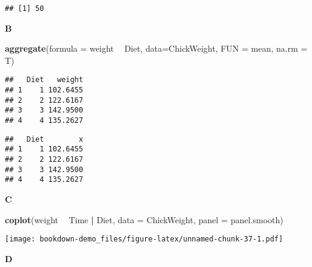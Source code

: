 \documentclass[]{book}
\newenvironment{Shaded}{\begin{snugshade}}{\end{snugshade}}
\newcommand{\CommentTok}[1]{\textcolor[rgb]{0.56,0.35,0.01}{\textit{#1}}}
\newcommand{\DataTypeTok}[1]{\textcolor[rgb]{0.13,0.29,0.53}{#1}}
\newcommand{\KeywordTok}[1]{\textcolor[rgb]{0.13,0.29,0.53}{\textbf{#1}}}
\newcommand{\NormalTok}[1]{#1}
\newcommand{\OperatorTok}[1]{\textcolor[rgb]{0.81,0.36,0.00}{\textbf{#1}}}
\newcommand{\StringTok}[1]{\textcolor[rgb]{0.31,0.60,0.02}{#1}}
\begin{document}
\begin{verbatim}
## [1] 50
\end{verbatim}

\textbf{B}

\begin{Shaded}
\begin{Highlighting}[]
\KeywordTok{aggregate}\NormalTok{(}\DataTypeTok{formula =}\NormalTok{ weight }\OperatorTok{~}\StringTok{ }\NormalTok{Diet, }\DataTypeTok{data=}\NormalTok{ChickWeight, }\DataTypeTok{FUN =}\NormalTok{ mean, }\DataTypeTok{na.rm =}\NormalTok{ T)}
\end{Highlighting}
\end{Shaded}

\begin{verbatim}
##   Diet   weight
## 1    1 102.6455
## 2    2 122.6167
## 3    3 142.9500
## 4    4 135.2627
\end{verbatim}

\begin{Shaded}
\end{Shaded}

\begin{verbatim}
##   Diet        x
## 1    1 102.6455
## 2    2 122.6167
## 3    3 142.9500
## 4    4 135.2627
\end{verbatim}

\textbf{C}

\begin{Shaded}
\begin{Highlighting}[]
\KeywordTok{coplot}\NormalTok{(weight }\OperatorTok{~}\StringTok{ }\NormalTok{Time }\OperatorTok{|}\StringTok{ }\NormalTok{Diet, }\DataTypeTok{data =}\NormalTok{ ChickWeight, }\DataTypeTok{panel =}\NormalTok{ panel.smooth)}
\end{Highlighting}
\end{Shaded}

\texttt{[image: bookdown-demo\_files/figure-latex/unnamed-chunk-37-1.pdf]}

\textbf{D}
\end{document}
